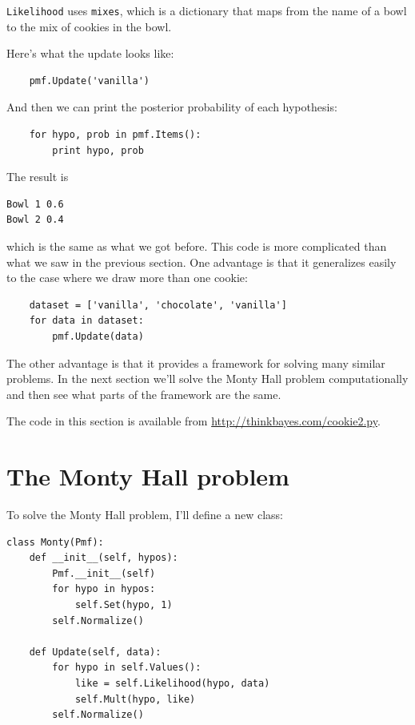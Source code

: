 \documentclass[12pt]{book}
\begin{document}
\verb"Likelihood" uses \verb"mixes", which is a dictionary
that maps from the name of a bowl to the mix of cookies in
the bowl.

Here's what the update looks like:

\begin{verbatim}
    pmf.Update('vanilla')
\end{verbatim}

And then we can print the posterior probability of each hypothesis:

\begin{verbatim}
    for hypo, prob in pmf.Items():
        print hypo, prob
\end{verbatim}

The result is

\begin{verbatim}
Bowl 1 0.6
Bowl 2 0.4
\end{verbatim}

which is the same as what we got before.  This code is more complicated
than what we saw in the previous section.  One advantage is that it
generalizes easily to the case where we draw more than one cookie:

\begin{verbatim}
    dataset = ['vanilla', 'chocolate', 'vanilla']
    for data in dataset:
        pmf.Update(data)
\end{verbatim}

The other advantage is that it provides a framework for solving many
similar problems.  In the next section we'll solve the Monty Hall
problem computationally and then see what parts of the framework are
the same.

The code in this section is available from
\url{http://thinkbayes.com/cookie2.py}.


\section{The Monty Hall problem}

To solve the Monty Hall problem, I'll define a new class:

\begin{verbatim}
class Monty(Pmf):
    def __init__(self, hypos):
        Pmf.__init__(self)
        for hypo in hypos:
            self.Set(hypo, 1)
        self.Normalize()

    def Update(self, data):
        for hypo in self.Values():
            like = self.Likelihood(hypo, data)
            self.Mult(hypo, like)
        self.Normalize()
\end{verbatim}
\end{document}
